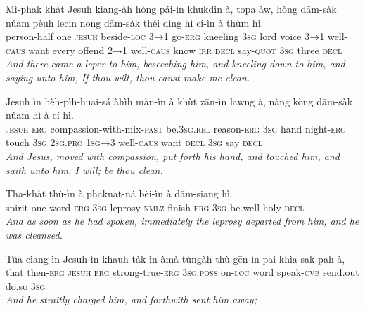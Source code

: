 \documentclass[11pt,a4paper]{article}
\begin{document}
\begin{exe}
\gll Mì-phak khàt Jesuh kìang-àh hòng pái-ìn khukdin à, topa àw, hòng dām-sàk núam pèuh lecin nong dām-sàk théi dìng hì cí-ìn à thùm hì. \\
     person-half one \textsc{jesuh} beside-\textsc{loc} \textsc{3→1} go-\textsc{erg} kneeling \textsc{3sg} lord voice \textsc{3→1} well-\textsc{caus} want every offend \textsc{2→1} well-\textsc{caus} know \textsc{irr} \textsc{decl} say-\textsc{quot} \textsc{3sg} three \textsc{decl} \\
\glt \textcolor{kjvcolor}{\textit{And there came a leper to him, beseeching him, and kneeling down to him, and saying unto him, If thou wilt, thou canst make me clean.}}

\gll Jesuh ìn hèh-pìh-huai-sá àhìh màn-ìn à khùt zān-ìn lawng à, nàng kòng dām-sàk núam hì à cí hì. \\
     \textsc{jesuh} \textsc{erg} compassion-with-mix-\textsc{past} be.\textsc{3sg}.\textsc{rel} reason-\textsc{erg} \textsc{3sg} hand night-\textsc{erg} touch \textsc{3sg} \textsc{2sg}.\textsc{pro} \textsc{1sg→3} well-\textsc{caus} want \textsc{decl} \textsc{3sg} say \textsc{decl} \\
\glt \textcolor{kjvcolor}{\textit{And Jesus, moved with compassion, put forth his hand, and touched him, and saith unto him, I will; be thou clean.}}

\gll Tha-khàt thù-ìn à phaknat-ná bèi-ìn à dām-siang hì. \\
     spirit-one word-\textsc{erg} \textsc{3sg} leprosy-\textsc{nmlz} finish-\textsc{erg} \textsc{3sg} be.well-holy \textsc{decl} \\
\glt \textcolor{kjvcolor}{\textit{And as soon as he had spoken, immediately the leprosy departed from him, and he was cleansed.}}

\gll Túa cìang-ìn Jesuh ìn khauh-tàk-ìn àmà tùngàh thù gēn-ìn pai-khìa-sak pah à, \\
     that then-\textsc{erg} \textsc{jesuh} \textsc{erg} strong-true-\textsc{erg} \textsc{3sg}.\textsc{poss} on-\textsc{loc} word speak-\textsc{cvb} send.out do.so \textsc{3sg} \\
\glt \textcolor{kjvcolor}{\textit{And he straitly charged him, and forthwith sent him away;}}


\end{exe}
\end{document}
